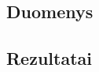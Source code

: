 \documentclass[fleqn]{VUMIFKompMagistrinis}
\begin{document}
\subsection{Duomenys}
\subsection{Rezultatai}




\end{document}
